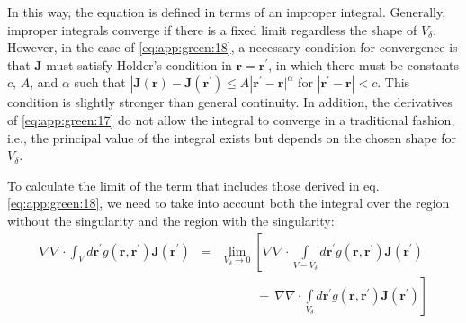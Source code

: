 			In this way, the equation is defined in terms of an improper integral. Generally, improper integrals converge if there is a fixed limit regardless the shape of $V_\delta$. However, in the case of \eqref{eq:app:green:18}, a necessary condition for convergence is that $\mathbf{J}$ must satisfy Holder's condition \citep{kellogg1953foundations} in $\mathbf{r}=\mathbf{r^\prime}$, in which there must be constants $c$, $A$, and $\alpha$ such that $|\mathbf{J}(\mathbf{r})-\mathbf{J}(\mathbf{r^\prime})\le A|\mathbf{r^\prime}-\mathbf{r}|^{\alpha}$ for $|\mathbf{r^\prime}-\mathbf{r}| < c$. This condition is slightly stronger than general continuity. In addition, the derivatives of \eqref{eq:app:green:17} do not allow the integral to converge in a traditional fashion, i.e., the principal value of the integral exists but depends on the chosen shape for $V_\delta$.
			
			To calculate the limit of the term that includes those derived in eq.\eqref{eq:app:green:18}, we need to take into account both the integral over the region without the singularity and the region with the singularity:
			\begin{eqnarray}
				\nabla\nabla\cdot\int_V d\mathbf{r^\prime} g(\mathbf{r},\mathbf{r^\prime})\mathbf{J}(\mathbf{r^\prime}) &=& \lim\limits_{V_\delta\rightarrow0} \left[\nabla\nabla\cdot\int\limits_{V-V_\delta} d\mathbf{r^\prime} g(\mathbf{r},\mathbf{r^\prime})\mathbf{J}(\mathbf{r^\prime})\right.\nonumber \\ &&\left.~~~~~~~~~~~~~+~\nabla\nabla\cdot\int\limits_{V_\delta} d\mathbf{r^\prime} g(\mathbf{r},\mathbf{r^\prime})\mathbf{J}(\mathbf{r^\prime})\right] \label{eq:app:green:19}
			\end{eqnarray}
		
